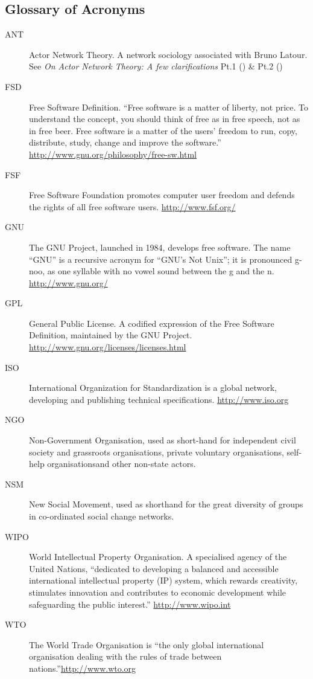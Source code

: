 \begin{appendices}
\section{Glossary of Acronyms}
\begin{description}
\item[ANT]{Actor Network Theory. A network sociology associated with Bruno Latour. See \textit{On Actor Network Theory: A few clarifications} Pt.1 (\cite{latour:1998ant1}) \& Pt.2 (\cite{latour:1998ant2})}
\item[FSD]{Free Software Definition. ``Free software is a matter of liberty, not price. To understand the concept, you should think of free as in free speech, not as in free beer. Free software is a matter of the users' freedom to run, copy, distribute, study, change and improve the software.''  \newline\url{http://www.gnu.org/philosophy/free-sw.html}}
\item[FSF]{Free Software Foundation promotes computer user freedom and defends the rights of all free software users.  \newline\url{http://www.fsf.org/}}
\item[GNU]{The GNU Project, launched in 1984, develops free software. The name “GNU” is a recursive acronym for “GNU's Not Unix”; it is pronounced g-noo, as one syllable with no vowel sound between the g and the n.  \newline\url{http://www.gnu.org/}}
\item[GPL]{General Public License. A codified expression of the Free Software Definition, maintained by the GNU Project.  \newline\url{http://www.gnu.org/licenses/licenses.html}}
\item[ISO]{International Organization for Standardization is a global network, developing and publishing technical specifications. \newline\url{http://www.iso.org}}
\item[NGO]{Non-Government Organisation, used as short-hand for independent civil society and grassroots organisations, private voluntary organisations, self-help organisations\linebreak and other non-state actors.}
\item[NSM]{New Social Movement, used as shorthand for the great diversity of groups in co-ordinated social change networks.}
\item[WIPO]{World Intellectual Property Organisation. A specialised agency of the United Nations, ``dedicated to developing a balanced and accessible international intellectual property (IP) system, which rewards creativity, stimulates innovation and contributes to economic development while safeguarding the public interest.''  \newline\url{http://www.wipo.int}}
\item[WTO]{The World Trade Organisation is ``the only global international organisation dealing with the rules of trade between nations.''\newline\url{http://www.wto.org}}
\end{description}
\newpage

\end{appendices}
